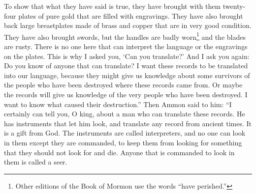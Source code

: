 To show that what they have said is true, they have brought with them twenty-four plates of pure gold that are filled with engravings.
\bverse \iffalse And behold, also, they have brought breastplates, which are large, and they are of brass and of copper, and are perfectly sound. \fi
They have also brought back large breastplates made of brass and copper that are in very good condition.
\bverse \iffalse And again, they have brought swords, the hilts thereof have perished, and the blades thereof were cankered with rust; and there is no one in the land that is able to interpret the language or the engravings that are on the plates. Therefore I said unto thee: Canst thou translate? \fi
They have also brought swords, but the handles are badly worn\footnote{Other editions of the Book of Mormon use the words ``have perished.''} and the blades are rusty. There is no one here that can interpret the language or the engravings on the plates. This is why I asked you, \lq Can you translate?\rq
\bverse \iffalse And I say unto thee again: Knowest thou of any one that can translate? For I am desirous that these records should be translated into our language; for, perhaps, they will give us a knowledge of a remnant of the people who have been destroyed, from whence these records came; or, perhaps, they will give us a knowledge of this very people who have been destroyed; and I am desirous to know the cause of their destruction. \fi
And I ask you again: Do you know of anyone that can translate? I want these records to be translated into our language, because they might give us knowledge about some survivors of the people who have been destroyed where these records came from. Or maybe the records will give us knowledge of the very people who have been destroyed. I want to know what caused their destruction.''
\bverse \iffalse Now Ammon said unto him: I can assuredly tell thee, O king, of a man that can translate the records; for he has wherewith that he can look, and translate all records that are of ancient date; and it is a gift from God. And the things are called interpreters, and no man can look in them except he be commanded, lest he should look for that he ought not and he should perish.  And whosoever is commanded to look in them, the same is called seer. \fi
Then Ammon said to him: ``I certainly can tell you, O king, about a man who can translate these records. He has instruments that let him look, and translate any record from ancient times. It is a gift from God. The instruments are called interpreters, and no one can look in them except they are commanded, to keep them from looking for something that they should not look for and die. Anyone that is commanded to look in them is called a seer.
